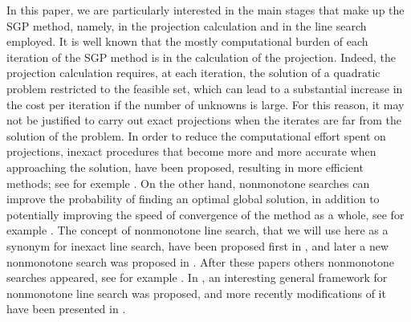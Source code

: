 In this paper, we are particularly interested in the main stages that make up the SGP method, namely, in the projection calculation and in the line search employed.   It is well known that the mostly computational burden of each iteration of the SGP method is in the calculation of the projection.  Indeed, the   projection calculation requires, at each  iteration, the solution of a quadratic problem restricted to the feasible set,  which can lead to a substantial increase in the cost per iteration if the number of unknowns is large. For this reason, it may not be justified to carry out exact projections when the iterates are far from the solution of the problem. In order to reduce the computational effort spent on projections, inexact procedures that become more and more accurate when approaching the solution, have been proposed, resulting in more efficient methods;  see  for exemple   \cite{BirginMartinezRaydan2003, Bonettini2016,Golbabaee_Davies2018, Gonccalves2020, SalzoVilla2012, VillaSalzo2013, Rasch2020}.  On the other hand, nonmonotone searches can improve the probability of finding an optimal global solution, in addition to potentially improving the speed of convergence of the method as a whole, see for example \cite{Dai2002, Panier1991, Toint1996}. The concept of nonmonotone line search,  that we will use here as a synonym for  inexact line search,  have been proposed first in \cite{Grippo1986}, and  later a new nonmonotone search was proposed in \cite{ZhangHager2004}.  After these papers  others  nonmonotone searches appeared, see for example  \cite{Ahookhosh2012, MoLiuYan2007}.  In \cite{SachsSachs2011}, an interesting general framework for nonmonotone line search was proposed, and more recently modifications of it have been presented in \cite{GrapigliaSachs2017, GrapigliaSachs2020}.

